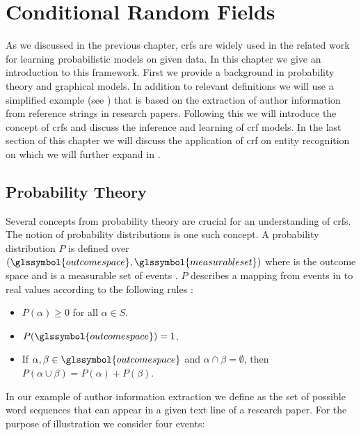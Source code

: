 \chapter{Conditional Random Fields}\label{cha:crfs}

As we discussed in the previous chapter, \glspl{crf} are widely used in the related work for learning probabilistic models on given data.
In this chapter we give an introduction to this framework.
First we provide a background in probability theory and graphical models.
In addition to relevant definitions we will use a simplified example (see ) that is based on the extraction of author information from reference strings in research papers.
Following this we will introduce the concept of \glspl{crf} and discuss the inference and learning of \gls{crf} models.
In the last section of this chapter we will discuss the application of \gls{crf} on entity recognition on which we will further expand in .\\


\section{Probability Theory}\label{sec:probability-theory}
Several concepts from probability theory are crucial for an understanding of \glspl{crf}.
The notion of \glspl{probability distribution} is one such concept.
A \gls{probability distribution} $P$ is defined over $(\glssymbol{outcome space},\glssymbol{measurable set})$ where  is the \gls{outcome space} and  is a \gls{measurable set} of \glspl{event} \citep{koller2009probabilistic}.
$P$ describes a mapping from events in  to real values according to the following rules \citep{koller2009probabilistic}:
\begin{itemize}
  \item $P(\alpha)\geq 0 $ for all $ \alpha \in S$.
  \item $P(\glssymbol{outcome space})=1$.
  \item If $\alpha,\beta\in \glssymbol{outcome space}$ and $\alpha\cap\beta = \emptyset$, then $P(\alpha\cup\beta)=P(\alpha)+P(\beta)$.
\end{itemize}

In our example of author information extraction we define  as the set of possible word sequences that can appear in a given text line of a research paper.
For the purpose of illustration we consider four events:

